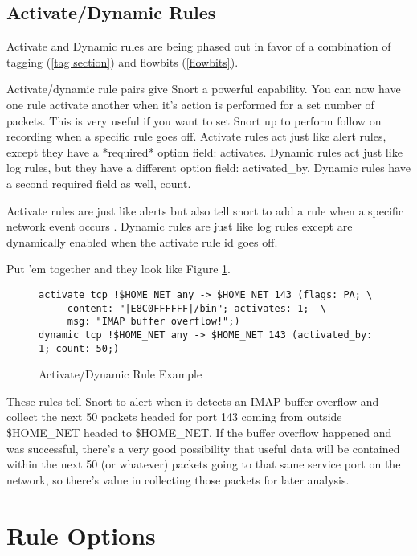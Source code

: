 \documentclass[english]{report}
\newenvironment{note}{
    \vspace{10pt}{\textsf{
        {\Huge{$\triangle$\hspace{-12.5pt}{\Large{$^!$}}}}\hspace{5pt}
        {\Large{NOTE}}
    }
    }

    \begin{center}
    \par\vspace{-10pt}
    \begin{lrbox}{\savepar}
    \begin{minipage}[r]{6.2in}
}
{
    \end{minipage}
    \end{lrbox}
    \fbox{
        \usebox{
            \savepar
        }
    }
    \par\vskip10pt
    \end{center}
}
\begin{document}
\subsection{Activate/Dynamic Rules}

\begin{note}
Activate and Dynamic rules are being phased out in favor of a combination of tagging (\ref{tag section}) and flowbits (\ref{flowbits}). 
\end{note}

Activate/dynamic rule pairs give Snort a powerful capability. You
can now have one rule activate another when it's action is performed
for a set number of packets. This is very useful if you want to set
Snort up to perform follow on recording when a specific rule goes
off. Activate rules act just like alert rules, except they
have a {*}required{*} option field: activates.
Dynamic rules act just like log rules, but they have a different option
field: activated\_by. Dynamic rules have a second
required field as well, count. 

Activate rules are just like alerts but also tell snort to add a rule
when a specific network event occurs . Dynamic rules are just like
log rules except are dynamically enabled when the activate rule id
goes off. 

Put 'em together and they look like Figure \ref{activate/dynamic rule example}.

%
\begin{figure}[!hbpt]
\begin{verbatim}
activate tcp !$HOME_NET any -> $HOME_NET 143 (flags: PA; \
     content: "|E8C0FFFFFF|/bin"; activates: 1;  \
     msg: "IMAP buffer overflow!";)
dynamic tcp !$HOME_NET any -> $HOME_NET 143 (activated_by: 1; count: 50;)
\end{verbatim}

\caption{Activate/Dynamic Rule Example\label{activate/dynamic rule example}}
\end{figure}

These rules tell Snort to alert when it detects an IMAP buffer overflow
and collect the next 50 packets headed for port 143 coming from outside
\$HOME\_NET headed to \$HOME\_NET. If the buffer overflow happened
and was successful, there's a very good possibility that useful data
will be contained within the next 50 (or whatever) packets going to
that same service port on the network, so there's value in collecting
those packets for later analysis.

\newpage
\section{Rule Options}
\end{document}

